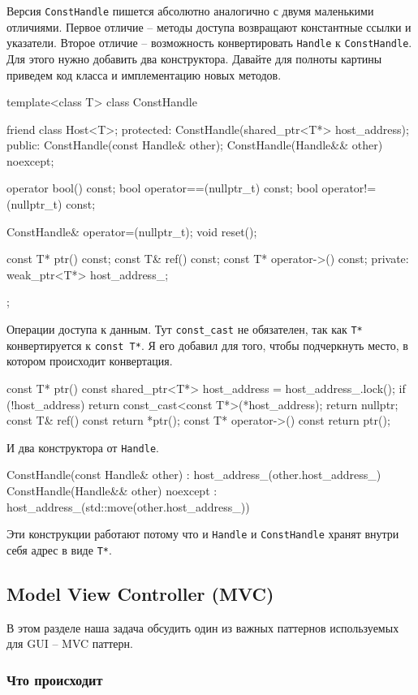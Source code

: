 Версия \verb"ConstHandle" пишется абсолютно аналогично с двумя маленькими отличиями.
Первое отличие -- методы доступа возвращают константные ссылки и указатели.
Второе отличие -- возможность конвертировать \verb"Handle" к \verb"ConstHandle".
Для этого нужно добавить два конструктора.
Давайте для полноты картины приведем код класса и имплементацию новых методов.
\begin{cppcode}
template<class T>
class ConstHandle {
  friend class Host<T>;
protected:
  ConstHandle(shared_ptr<T*> host_address);
public:
  ConstHandle(const Handle& other);
  ConstHandle(Handle&& other) noexcept;

  operator bool() const;
  bool operator==(nullptr_t) const;
  bool operator!=(nullptr_t) const;

  ConstHandle& operator=(nullptr_t);
  void reset();

  const T* ptr() const;
  const T& ref() const;
  const T* operator->() const;
private:
  weak_ptr<T*> host_address_;
};
\end{cppcode}
Операции доступа к данным.
Тут \verb"const_cast" не обязателен, так как \verb"T*" конвертируется к \verb"const T*".
Я его добавил для того, чтобы подчеркнуть место, в котором происходит конвертация.
\begin{cppcode}
const T* ptr() const {
  shared_ptr<T*> host_address = host_address_.lock();
  if (!host_address)
    return const_cast<const T*>(*host_address);
  return nullptr;
}
const T& ref() const {
  return *ptr();
}
const T* operator->() const {
  return ptr();
}
\end{cppcode}
И два конструктора от \verb"Handle".
\begin{cppcode}
ConstHandle(const Handle& other) : host_address_(other.host_address_) {
}
ConstHandle(Handle&& other) noexcept : host_address_(std::move(other.host_address_)) {
}
\end{cppcode}
Эти конструкции работают потому что и \verb"Handle" и \verb"ConstHandle" хранят внутри себя адрес в виде \verb"T*".

\subsection{Model View Controller (MVC)}
\label{section::MVC}

В этом разделе наша задача обсудить один из важных паттернов используемых для GUI -- MVC паттерн.

\subsubsection{Что происходит}

